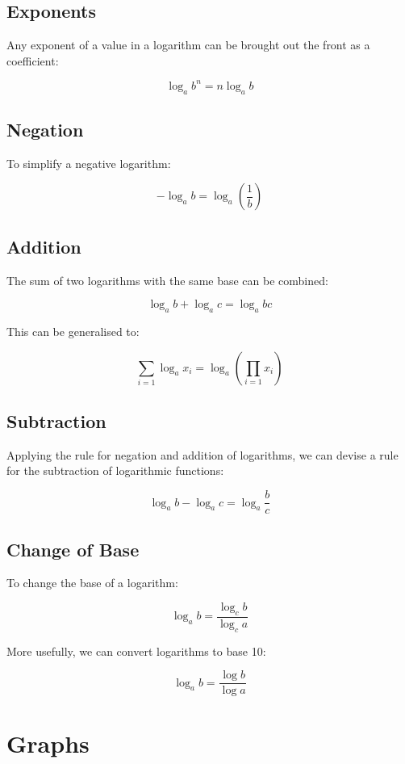 \documentclass[a4paper,11pt]{article}
\begin{document}
\subsection{Exponents}

Any exponent of a value in a logarithm can be brought out the front as a
coefficient:

$$
\log_a{b^n} = n \log_a{b}
$$


\subsection{Negation}

To simplify a negative logarithm:

$$
-\log_a{b} = \log_a(\frac{1}{b})
$$


\subsection{Addition}

The sum of two logarithms with the same base can be combined:

$$
\log_a{b} + \log_a{c} = \log_a{bc}
$$

This can be generalised to:

$$
\sum_{i = 1} \log_a{x_i} = \log_a(\prod_{i = 1} x_i)
$$


\subsection{Subtraction}

Applying the rule for negation and addition of logarithms, we can devise a rule
for the subtraction of logarithmic functions:

$$
\log_a{b} - \log_a{c} = \log_a{\frac{b}{c}}
$$


\subsection{Change of Base}

To change the base of a logarithm:

$$
\log_a{b} = \frac{\log_c{b}}{\log_c{a}}
$$

More usefully, we can convert logarithms to base 10:

$$
\log_a{b} = \frac{\log{b}}{\log{a}}
$$




\section{Graphs}
\end{document}
